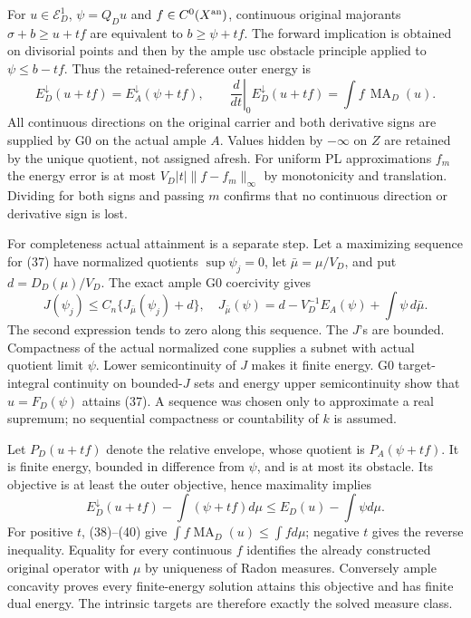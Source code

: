 \documentclass[
  10pt,
]{article}
\begin{document}
For \(u\in\mathcal E_D^1\), \(\psi=Q_Du\) and \(f\in C^0(X^{\rm an})\),
continuous original majorants \(\sigma+b\geq u+tf\) are equivalent to
\(b\geq\psi+tf\). The forward implication is obtained on divisorial
points and then by the ample usc obstacle principle applied to
\(\psi\leq b-tf\). Thus the retained-reference outer energy is
\[E_D^\downarrow(u+tf)=E_A^\downarrow(\psi+tf),\qquad
\left.\frac d{dt}\right|_{0}E_D^\downarrow(u+tf)
=\int f\,\operatorname{MA}_D(u).\tag{38}\] All continuous directions on
the original carrier and both derivative signs are supplied by G0 on the
actual ample \(A\). Values hidden by \(-\infty\) on \(Z\) are retained
by the unique quotient, not assigned afresh. For uniform PL
approximations \(f_m\) the energy error is at most
\(V_D|t|\|f-f_m\|_\infty\) by monotonicity and translation. Dividing for
both signs and passing \(m\) confirms that no continuous direction or
derivative sign is lost.

For completeness actual attainment is a separate step. Let a maximizing
sequence for (37) have normalized quotients \(\sup\psi_j=0\), let
\(\bar\mu=\mu/V_D\), and put \(d=D_D(\mu)/V_D\). The exact ample G0
coercivity gives \[J(\psi_j)\leq C_n\{J_{\bar\mu}(\psi_j)+d\},\quad
J_{\bar\mu}(\psi)=d-V_D^{-1}E_A(\psi)+\int\psi\,d\bar\mu.\tag{39}\] The
second expression tends to zero along this sequence. The \(J\)'s are
bounded. Compactness of the actual normalized cone supplies a subnet
with actual quotient limit \(\psi\). Lower semicontinuity of \(J\) makes
it finite energy. G0 target-integral continuity on bounded-\(J\) sets
and energy upper semicontinuity show that \(u=F_D(\psi)\) attains (37).
A sequence was chosen only to approximate a real supremum; no sequential
compactness or countability of \(k\) is assumed.

Let \(P_D(u+tf)\) denote the relative envelope, whose quotient is
\(P_A(\psi+tf)\). It is finite energy, bounded in difference from
\(\psi\), and is at most its obstacle. Its objective is at least the
outer objective, hence maximality implies
\[E_D^\downarrow(u+tf)-\int(\psi+tf)d\mu
\leq E_D(u)-\int\psi d\mu.\tag{40}\] For positive \(t\), (38)--(40) give
\(\int f\operatorname{MA}_D(u)\leq\int f d\mu\); negative \(t\) gives
the reverse inequality. Equality for every continuous \(f\) identifies
the already constructed original operator with \(\mu\) by uniqueness of
Radon measures. Conversely ample concavity proves every finite-energy
solution attains this objective and has finite dual energy. The
intrinsic targets are therefore exactly the solved measure class.
\end{document}
